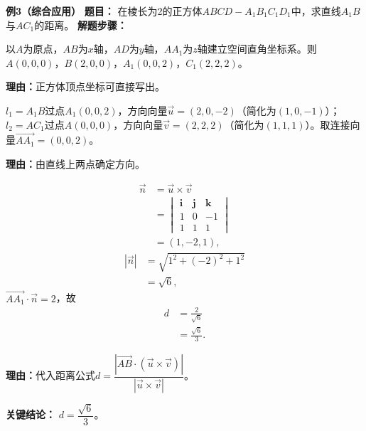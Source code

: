 \begin{examplebox}
	\medskip
	\textbf{\textcolor{CExample}{例3（综合应用）}}
	\textbf{\textcolor{CExample}{题目：}}
	在棱长为2的正方体$ABCD-A_1B_1C_1D_1$中，求直线$A_1B$与$AC_1$的距离。
	\textbf{\textcolor{CExample}{解题步骤：}}
	\begin{description}[style=nextline, leftmargin=2.8em, labelsep=0.5em, itemsep=0.45em]
		\item[\textbf{第一步（建系与坐标）：}]
			以$A$为原点，$AB$为$x$轴，$AD$为$y$轴，$AA_1$为$z$轴建立空间直角坐标系。则$A(0,0,0)$，$B(2,0,0)$，$A_1(0,0,2)$，$C_1(2,2,2)$。
			\par\textbf{理由：}正方体顶点坐标可直接写出。
		\item[\textbf{第二步（确定向量）：}]
			$l_1=A_1B$过点$A_1(0,0,2)$，方向向量$\vec{u}=(2,0,-2)$（简化为$(1,0,-1)$）；$l_2=AC_1$过点$A(0,0,0)$，方向向量$\vec{v}=(2,2,2)$（简化为$(1,1,1)$）。取连接向量$\overrightarrow{AA_1}=(0,0,2)$。
			\par\textbf{理由：}由直线上两点确定方向。
		\item[\textbf{第三步（代公式计算）：}]
			\[
				\begin{aligned}
					\vec{n} &= \vec{u}\times\vec{v} \\ &=
					\begin{vmatrix}
						\mathbf{i} & \mathbf{j} & \mathbf{k} \\ 1 & 0 & -1 \\ 1 & 1 & 1
				\end{vmatrix}
					\\ &= (1,-2,1),
			\end{aligned}
			\]
			\[
				\begin{aligned}
					|\vec{n}| &= \sqrt{1^2+(-2)^2+1^2} \\ &= \sqrt{6},
			\end{aligned}
			\]
			$\overrightarrow{AA_1}\cdot\vec{n}=2$，故
			\[
				\begin{aligned}
					d &= \frac{2}{\sqrt{6}} \\ &= \frac{\sqrt{6}}{3}.
			\end{aligned}
			\]
			\par\textbf{理由：}代入距离公式$d=\dfrac{|\overrightarrow{AB}\cdot(\vec{u}\times\vec{v})|}{|\vec{u}\times\vec{v}|}$。
	\end{description}
	\textbf{\textcolor{CExample}{关键结论：}}
	\textbf{$d=\dfrac{\sqrt{6}}{3}$}。
\end{examplebox}
